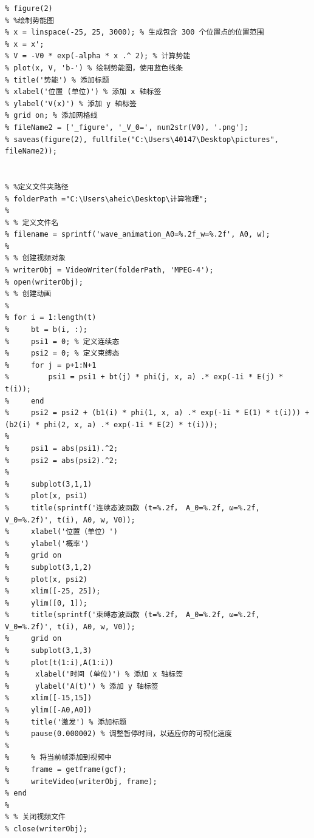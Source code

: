 \documentclass[aspectratio=169]{beamer}
\begin{document}
\begin{lstlisting}
% figure(2)
% %绘制势能图
% x = linspace(-25, 25, 3000); % 生成包含 300 个位置点的位置范围
% x = x';
% V = -V0 * exp(-alpha * x .^ 2); % 计算势能
% plot(x, V, 'b-') % 绘制势能图，使用蓝色线条
% title('势能') % 添加标题
% xlabel('位置 (单位)') % 添加 x 轴标签
% ylabel('V(x)') % 添加 y 轴标签
% grid on; % 添加网格线
% fileName2 = ['_figure', '_V_0=', num2str(V0), '.png'];
% saveas(figure(2), fullfile("C:\Users\40147\Desktop\pictures", fileName2));


% %定义文件夹路径
% folderPath ="C:\Users\aheic\Desktop\计算物理";
% 
% % 定义文件名
% filename = sprintf('wave_animation_A0=%.2f_w=%.2f', A0, w);
% 
% % 创建视频对象
% writerObj = VideoWriter(folderPath, 'MPEG-4');
% open(writerObj);
% % 创建动画
% 
% for i = 1:length(t)
%     bt = b(i, :);
%     psi1 = 0; % 定义连续态
%     psi2 = 0; % 定义束缚态
%     for j = p+1:N+1
%         psi1 = psi1 + bt(j) * phi(j, x, a) .* exp(-1i * E(j) * t(i));
%     end
%     psi2 = psi2 + (b1(i) * phi(1, x, a) .* exp(-1i * E(1) * t(i))) + (b2(i) * phi(2, x, a) .* exp(-1i * E(2) * t(i)));
% 
%     psi1 = abs(psi1).^2;
%     psi2 = abs(psi2).^2;
% 
%     subplot(3,1,1)
%     plot(x, psi1)
%     title(sprintf('连续态波函数 (t=%.2f， A_0=%.2f, ω=%.2f, V_0=%.2f)', t(i), A0, w, V0));
%     xlabel('位置（单位）')
%     ylabel('概率')
%     grid on
%     subplot(3,1,2)
%     plot(x, psi2)
%     xlim([-25, 25]);
%     ylim([0, 1]);
%     title(sprintf('束缚态波函数 (t=%.2f， A_0=%.2f, ω=%.2f, V_0=%.2f)', t(i), A0, w, V0));
%     grid on
%     subplot(3,1,3)
%     plot(t(1:i),A(1:i))
%      xlabel('时间 (单位)') % 添加 x 轴标签
%      ylabel('A(t)') % 添加 y 轴标签
%     xlim([-15,15])
%     ylim([-A0,A0])
%     title('激发') % 添加标题
%     pause(0.000002) % 调整暂停时间，以适应你的可视化速度
% 
%     % 将当前帧添加到视频中
%     frame = getframe(gcf);
%     writeVideo(writerObj, frame);
% end
% 
% % 关闭视频文件
% close(writerObj);


\end{lstlisting}
\end{document}
